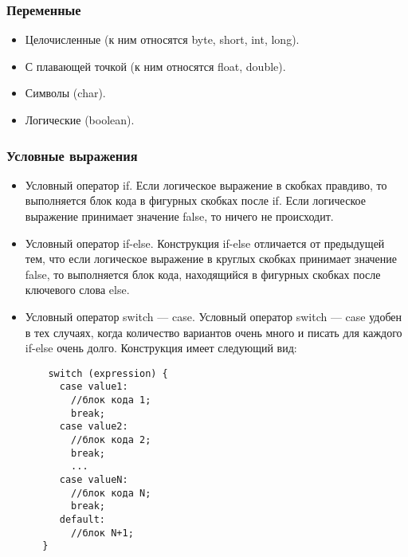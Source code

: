 \documentclass[12pt]{matmex-diploma}
\begin{document}
    \subsubsection*{Переменные}
        \begin{itemize}
            \item Целочисленные (к ним относятся byte, short, int, long).
            \item С плавающей точкой (к ним относятся float, double).
            \item Символы (char).
            \item Логические (boolean).
        \end{itemize}

    \subsubsection*{Условные выражения}
        \begin{itemize}
            \item Условный оператор if. Если логическое выражение в скобках правдиво, то выполняется блок кода в фигурных скобках {} после if. Если логическое выражение принимает значение false, то ничего не происходит.
            \item Условный оператор if-else. Конструкция if-else отличается от предыдущей тем, что если логическое выражение в круглых скобках принимает значение false, то выполняется блок кода, находящийся в фигурных скобках после ключевого слова else.
            \item Условный оператор switch — case. Условный оператор switch — case удобен в тех случаях, когда количество вариантов очень много и писать для каждого if-else очень долго. Конструкция имеет следующий вид:
                \begin{verbatim}
    switch (expression) {
      case value1: 
        //блок кода 1;
        break;
      case value2: 
        //блок кода 2;  
        break;
        ...  
      case valueN: 
        //блок кода N;  
        break;  
      default:  
        //блок N+1;
   }
		        \end{verbatim} 
        \end{itemize}
        
\end{document}
